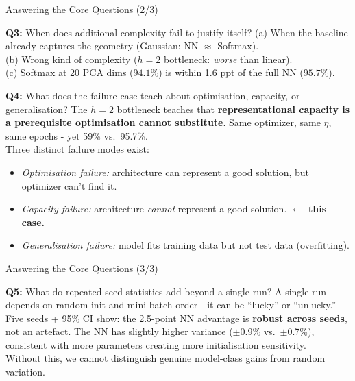 \documentclass[11pt,aspectratio=169]{beamer}
\begin{document}
\begin{frame}{Answering the Core Questions (2/3)}

\begin{block}{\textbf{Q3:} When does additional complexity fail to justify itself?}
(a) When the baseline already captures the geometry (Gaussian: NN $\approx$ Softmax).\\
(b) Wrong kind of complexity ($h{=}2$ bottleneck: \textit{worse} than linear).\\
(c) Softmax at 20 PCA dims ($94.1\%$) is within 1.6 ppt of the full NN ($95.7\%$).
\end{block}

\vspace{0.8em}

\begin{block}{\textbf{Q4:} What does the failure case teach about optimisation, capacity, or generalisation?}
The $h{=}2$ bottleneck teaches that \textbf{representational capacity is a prerequisite optimisation cannot substitute}.  Same optimizer, same $\eta$, same epochs - yet 59\% vs.\ 95.7\%.\\[3pt]
Three distinct failure modes exist:
\begin{itemize}
  \item \textit{Optimisation failure:} architecture can represent a good solution, but optimizer can't find it.
  \item \textit{Capacity failure:} architecture \textit{cannot} represent a good solution. \textbf{$\leftarrow$ this case.}
  \item \textit{Generalisation failure:} model fits training data but not test data (overfitting).
\end{itemize}
\end{block}

\end{frame}

\begin{frame}{Answering the Core Questions (3/3)}

\begin{block}{\textbf{Q5:} What do repeated-seed statistics add beyond a single run?}
A single run depends on random init and mini-batch order - it can be ``lucky'' or ``unlucky.''\\[3pt]
Five seeds + 95\% CI show: the 2.5-point NN advantage is \textbf{robust across seeds}, not an artefact.  The NN has slightly higher variance ($\pm$0.9\% vs.\ $\pm$0.7\%), consistent with more parameters creating more initialisation sensitivity.\\[3pt]
Without this, we cannot distinguish genuine model-class gains from random variation.
\end{block}

\end{frame}
\end{document}

